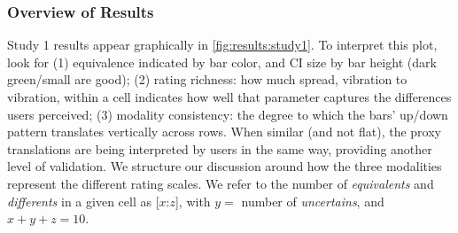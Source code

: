 \subsubsection{Overview of Results}
Study 1 results appear graphically in \autoref{fig:results:study1}.
To interpret this plot, look for 
(1) equivalence indicated by bar color, and CI size by bar height (dark green/small are good);
(2) rating richness: how much spread, vibration to vibration, within a cell indicates how well that parameter captures the differences users perceived;
(3) modality consistency: the degree to which the bars' up/down pattern translates vertically across rows. When similar (and not flat), the proxy translations are being interpreted by users in the same way, providing another level of validation.
We structure our discussion around how the three modalities represent the different rating scales. 
We refer to the number of \textit{equivalents} and \textit{differents} in a given cell as [$x$:$z$], with $y=$ number of \textit{uncertains}, and $x+y+z=10$.

